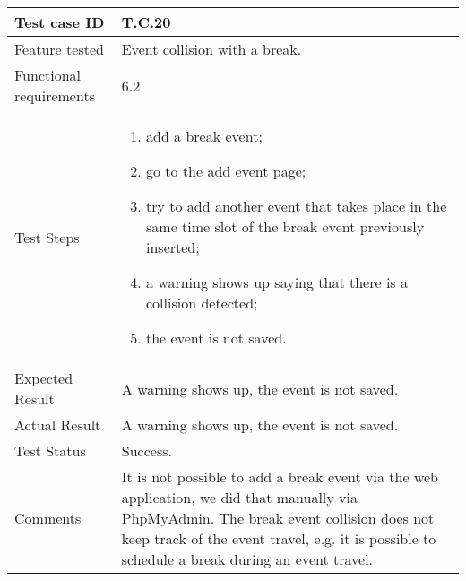 \begin{table}[H]
	\begin{center}
		\begin{tabular}{ | p{} | p{} | }
		\hline
		Test case ID & T.C.20\\
		\hline
		Feature tested & Event collision with a break.\\
    	\hline
		Functional requirements & 6.2  \\
		\hline
		Test Steps & 
			\begin{enumerate}
				\item add a break event;
				\item go to the add event page;
				\item try to add another event that takes place in the same time slot of the break event previously inserted;
				\item a warning shows up saying that there is a collision detected;
				\item the event is not saved.
			\end{enumerate} \\
		\hline
		Expected Result & A warning shows up, the event is not saved.\\
		\hline
		Actual Result & A warning shows up, the event is not saved.\\ 
		\hline
		Test Status & \color{ForestGreen}Success.\\ 
		\hline
		Comments & It is not possible to add a break event via the web application, we did that manually via PhpMyAdmin. The break event collision does not keep track of the event travel, e.g. it is possible to schedule a break during an event travel. \\
		\hline
		
		\end{tabular}
	\end{center}
\end{table}

